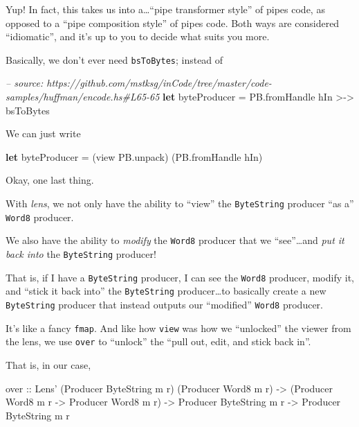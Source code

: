 \documentclass[]{article}
\newenvironment{Shaded}{}{}
\newcommand{\KeywordTok}[1]{\textcolor[rgb]{0.00,0.44,0.13}{\textbf{{#1}}}}
\newcommand{\DataTypeTok}[1]{\textcolor[rgb]{0.56,0.13,0.00}{{#1}}}
\newcommand{\CommentTok}[1]{\textcolor[rgb]{0.38,0.63,0.69}{\textit{{#1}}}}
\newcommand{\OtherTok}[1]{\textcolor[rgb]{0.00,0.44,0.13}{{#1}}}
\newcommand{\FunctionTok}[1]{\textcolor[rgb]{0.02,0.16,0.49}{{#1}}}
\newcommand{\NormalTok}[1]{{#1}}
\begin{document}
Yup! In fact, this takes us into a\ldots{}``pipe transformer style'' of pipes
code, as opposed to a ``pipe composition style'' of pipes code. Both ways are
considered ``idiomatic'', and it's up to you to decide what suits you more.

Basically, we don't ever need \texttt{bsToBytes}; instead of

\begin{Shaded}
\begin{Highlighting}[]
\CommentTok{-- source: https://github.com/mstksg/inCode/tree/master/code-samples/huffman/encode.hs#L65-65}
    \KeywordTok{let} \NormalTok{byteProducer }\FunctionTok{=} \NormalTok{PB.fromHandle hIn }\FunctionTok{>->} \NormalTok{bsToBytes}
\end{Highlighting}
\end{Shaded}

We can just write

\begin{Shaded}
\begin{Highlighting}[]
\KeywordTok{let} \NormalTok{byteProducer }\FunctionTok{=} \NormalTok{(view PB.unpack) (PB.fromHandle hIn)}
\end{Highlighting}
\end{Shaded}

Okay, one last thing.

With \emph{lens}, we not only have the ability to ``view'' the
\texttt{ByteString} producer ``as a'' \texttt{Word8} producer.

We also have the ability to \emph{modify} the \texttt{Word8} producer that we
``see''\ldots{}and \emph{put it back into} the \texttt{ByteString} producer!

That is, if I have a \texttt{ByteString} producer, I can see the \texttt{Word8}
producer, modify it, and ``stick it back into'' the \texttt{ByteString}
producer\ldots{}to basically create a new \texttt{ByteString} producer that
instead outputs our ``modified'' \texttt{Word8} producer.

It's like a fancy \texttt{fmap}. And like how \texttt{view} was how we
``unlocked'' the viewer from the lens, we use \texttt{over} to ``unlock'' the
``pull out, edit, and stick back in''.

That is, in our case,

\begin{Shaded}
\begin{Highlighting}[]
\OtherTok{over ::} \DataTypeTok{Lens'} \NormalTok{(}\DataTypeTok{Producer} \DataTypeTok{ByteString} \NormalTok{m r) (}\DataTypeTok{Producer} \DataTypeTok{Word8} \NormalTok{m r)}
     \OtherTok{->} \NormalTok{(}\DataTypeTok{Producer} \DataTypeTok{Word8} \NormalTok{m r }\OtherTok{->} \DataTypeTok{Producer} \DataTypeTok{Word8} \NormalTok{m r)}
     \OtherTok{->} \DataTypeTok{Producer} \DataTypeTok{ByteString} \NormalTok{m r}
     \OtherTok{->} \DataTypeTok{Producer} \DataTypeTok{ByteString} \NormalTok{m r}
\end{Highlighting}
\end{Shaded}
\end{document}
